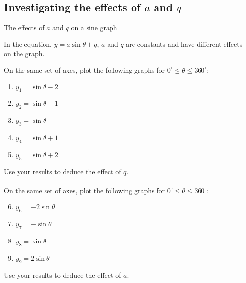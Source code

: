 \subsection*{Investigating the effects of $a$ and $q$}
\begin{Investigation}{The effects of $a$ and $q$ on a sine graph}
{In the equation, $y=a\sin\theta+q$, $a$ and $q$ are constants and have different effects on the graph.

On the same set of axes, plot the following graphs for $0^{\circ} \leq \theta \leq 360^{\circ}$:
\begin{enumerate}[noitemsep, label=\textbf{\arabic*}. ] 
\item $y_1=\sin\theta -2$
\item $y_2=\sin\theta -1$
\item $y_3=\sin\theta $
\item $y_4=\sin\theta +1$
\item $y_5=\sin\theta +2$
\end{enumerate}
Use your results to deduce the effect of $q$.\\
\\
On the same set of axes, plot the following graphs for $0^{\circ} \leq \theta \leq 360^{\circ}$:
\begin{enumerate}[noitemsep, label=\textbf{\arabic*}. ] 
\setcounter{enumi}{5}
\item $y_6=-2\sin\theta $
\item $y_7=-\sin\theta $
\item $y_8=\sin\theta $
\item $y_9=2\sin\theta $\end{enumerate}
Use your results to deduce the effect of $a$.\\
}
\end{Investigation}
